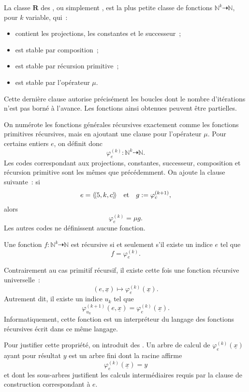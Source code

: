 \begin{defn}\label{general-recursive-definition}
La classe $\mathbf{R}$ des , ou simplement
, est la plus petite
classe de fonctions
$\mathbb{N}^k\dasharrow\mathbb{N}$, pour $k$ variable, qui :
\begin{itemize}
\item contient les projections, les constantes et le successeur ;
\item est stable par composition ;
\item est stable par récursion primitive ;
\item est stable par l'opérateur $\mu$.
\end{itemize}
\end{defn}

Cette dernière clause autorise précisément les boucles dont le nombre
d'itérations n'est pas borné à l'avance.  Les fonctions ainsi obtenues
peuvent être partielles.

\thingy On numérote les fonctions générales récursives exactement
comme les fonctions primitives récursives, mais en ajoutant une clause
pour l'opérateur $\mu$.  Pour certains entiers $e$, on définit donc
\[
\varphi_e^{(k)}\colon\mathbb{N}^k\dasharrow\mathbb{N}.
\]
Les codes correspondant aux projections, constantes, successeur,
composition et récursion primitive sont les mêmes que précédemment.
On ajoute la clause suivante : si
\[
e=\mathopen{\langle\!\langle}5,k,c\mathclose{\rangle\!\rangle}
\quad\text{et}\quad
g:=\varphi_c^{(k+1)},
\]
alors
\[
\varphi_e^{(k)}=\mu g.
\]
Les autres codes ne définissent aucune fonction.

Une fonction $f\colon\mathbb{N}^k\dasharrow\mathbb{N}$ est récursive
si et seulement s'il existe un indice $e$ tel que
\[
f=\varphi_e^{(k)}.
\]

\thingy Contrairement au cas primitif récursif, il existe cette fois
une fonction récursive universelle :
\[
(e,\underline{x})\mapsto\varphi_e^{(k)}(\underline{x}).
\]
Autrement dit, il existe un indice $u_k$ tel que
\[
\varphi_{u_k}^{(k+1)}(e,\underline{x})
 =\varphi_e^{(k)}(\underline{x}).
\]
Informatiquement, cette fonction est un interpréteur du langage des
fonctions récursives écrit dans ce même langage.

Pour justifier cette propriété, on introduit des .  Un arbre de calcul de
$\varphi_e^{(k)}(\underline{x})$ ayant pour résultat $y$ est un arbre
fini dont la racine affirme
\[
\varphi_e^{(k)}(\underline{x})=y
\]
et dont les sous-arbres justifient les calculs intermédiaires requis
par la clause de construction correspondant à $e$.

